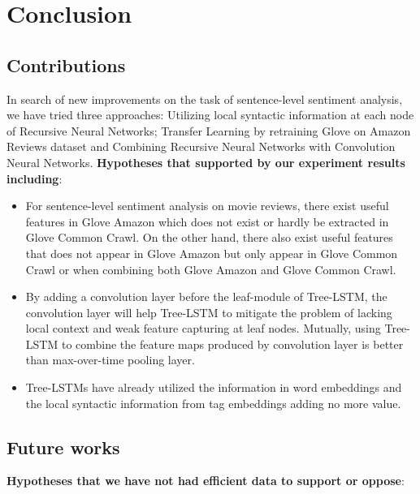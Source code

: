 \hypertarget{chap:conclude}{\chapter{Conclusion}}\label{conclusion}
\section{Contributions}
In search of new improvements on the task of sentence-level sentiment analysis, we have tried three approaches: Utilizing local syntactic information at each node of Recursive Neural Networks; Transfer Learning by retraining Glove on Amazon Reviews dataset and Combining Recursive Neural Networks with Convolution Neural Networks.
\textbf{Hypotheses that supported by our experiment results including}:
\begin{itemize}

\item For sentence-level sentiment analysis on movie reviews, there exist useful features in Glove Amazon which does not exist or hardly be extracted in Glove Common Crawl.
On the other hand, there also exist useful features that does not appear in Glove Amazon but only appear in Glove Common Crawl or when combining both Glove Amazon and Glove Common Crawl.

\item By adding a convolution layer before the leaf-module of Tree-LSTM, the convolution layer will help Tree-LSTM to mitigate the problem of lacking local context and weak feature capturing at leaf nodes.
Mutually, using Tree-LSTM to combine the feature maps produced by convolution layer is better than max-over-time pooling layer.

\item  Tree-LSTMs have already utilized the information in word embeddings and the local syntactic information from tag embeddings adding no more value. 
\end{itemize}

\section{Future works}
\label{unproved-hypo}
\textbf{Hypotheses that we have not had efficient data to support or oppose}:

